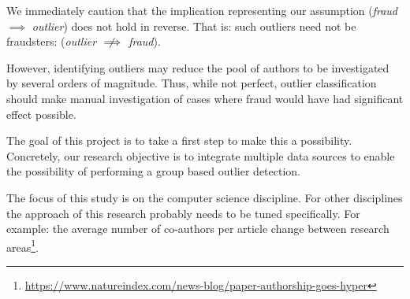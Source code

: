 \documentclass{ou-report}
\begin{document}
We immediately caution that the implication representing our assumption \newline
(\emph{fraud} $\implies$ \emph{outlier})
does not hold in reverse. That is: such outliers need not be fraudsters: 
(\emph{outlier} $\centernot\implies$ \emph{fraud}). 

However, identifying outliers may reduce the pool of authors to be investigated
by se\-veral orders of magnitude. Thus, while not perfect, outlier classification
should make manual investigation of cases where fraud would have had significant
effect possible.

The goal of this project is to take a first step to make this a possibility.
Concretely, our research objective is to integrate multiple data sources to enable the
possibility of performing a group based outlier detection.



The focus of this study is on the computer science 
discipline. For other disciplines the approach of this research probably needs
to be tuned specifically. 
For example: the average number of co-authors per article change between research 
areas\footnote{\url{https://www.natureindex.com/news-blog/paper-authorship-goes-hyper}}.
\end{document}
